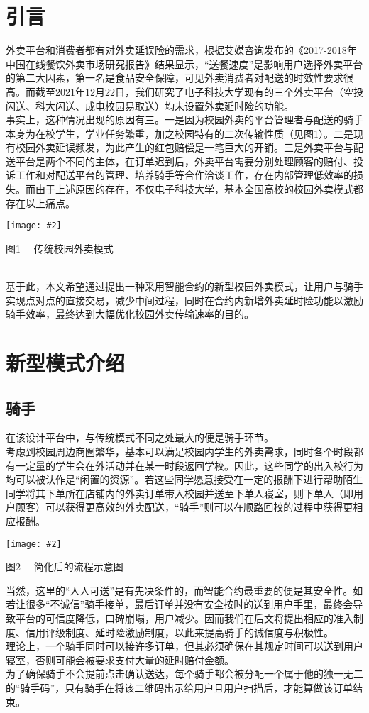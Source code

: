 \documentclass[UTF8]{ctexart}
\newcommand\picturehere[2][1]{\centerline{\texttt{[image: \#2]}}}
\newcommand\picfig[1]{\centerline{\small \heiti #1 \songti }}
\begin{document}
\begin{multicols}{2}
  \setcounter{section}{-1}
  \section{引言}
  外卖平台和消费者都有对外卖延误险的需求，根据艾媒咨询发布的《2017-2018年中国在线餐饮外卖市场研究报告》\cite{None20182017}结果显示，“送餐速度”是影响用户选择外卖平台的第二大因素，第一名是食品安全保障，可见外卖消费者对配送的时效性要求很高。而截至2021年12月22日，我们研究了电子科技大学现有的三个外卖平台（空投闪送、科大闪送、成电校园易取送）均未设置外卖延时险的功能。\\
  \indent 事实上，这种情况出现的原因有三。一是因为校园外卖的平台管理者与配送的骑手本身为在校学生，学业任务繁重，加之校园特有的二次传输性质（见图1）。二是现有校园外卖延误频发，为此产生的红包赔偿是一笔巨大的开销。三是外卖平台与配送平台是两个不同的主体，在订单迟到后，外卖平台需要分别处理顾客的赔付、投诉工作和对配送平台的管理、培养骑手等合作洽谈工作，存在内部管理低效率的损失。而由于上述原因的存在，不仅电子科技大学，基本全国高校的校园外卖模式都存在以上痛点。
  \picturehere[0.6]{image/tradition.png}
  \picfig{图1 \ \ 传统校园外卖模式}%
  \\
  \indent 基于此，本文希望通过提出一种采用智能合约的新型校园外卖模式，让用户与骑手实现点对点的直接交易，减少中间过程，同时在合约内新增外卖延时险功能以激励骑手效率，最终达到大幅优化校园外卖传输速率的目的。
  \section{新型模式介绍}

  \subsection{骑手}
  \indent 在该设计平台中，与传统模式不同之处最大的便是骑手环节。\\
  \indent 考虑到校园周边商圈繁华，基本可以满足校园内学生的外卖需求，同时各个时段都有一定量的学生会在外活动并在某一时段返回学校。因此，这些同学的出入校行为均可以被认作是“闲置的资源”。若这些同学愿意接受在一定的报酬下进行帮助陌生同学将其下单所在店铺内的外卖订单带入校园并送至下单人寝室，则下单人（即用户顾客）可以获得更高效的外卖配送，“骑手”则可以在顺路回校的过程中获得更相应报酬。\\
  \picturehere[0.6]{image/new1.png}
  \picfig{图2  \ \ 简化后的流程示意图}
  \indent 当然，这里的“人人可送”是有先决条件的，而智能合约最重要的便是其安全性。如若让很多“不诚信”骑手接单，最后订单并没有安全按时的送到用户手里，最终会导致平台的可信度降低，口碑崩塌，用户减少。因而我们在后文将提出相应的准入制度、信用评级制度、延时险激励制度，以此来提高骑手的诚信度与积极性。\\
  \indent 理论上，一个骑手同时可以接许多订单，但其必须确保在其规定时间可以送到用户寝室，否则可能会被要求支付大量的延时赔付金额。\\
  \indent 为了确保骑手不会提前点击确认送达，每个骑手都会被分配一个属于他的独一无二的“骑手码”，只有骑手在将该二维码出示给用户且用户扫描后，才能算做该订单结束。

\end{multicols}
\end{document}
